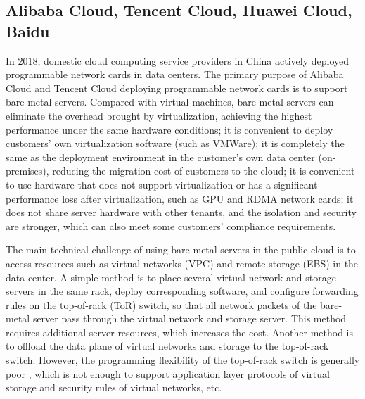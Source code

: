 \subsection{Alibaba Cloud, Tencent Cloud, Huawei Cloud, Baidu}

In 2018, domestic cloud computing service providers in China actively deployed programmable network cards in data centers. The primary purpose of Alibaba Cloud and Tencent Cloud deploying programmable network cards is to support bare-metal servers. Compared with virtual machines, bare-metal servers can eliminate the overhead brought by virtualization, achieving the highest performance under the same hardware conditions; it is convenient to deploy customers' own virtualization software (such as VMWare); it is completely the same as the deployment environment in the customer's own data center (on-premises), reducing the migration cost of customers to the cloud; it is convenient to use hardware that does not support virtualization or has a significant performance loss after virtualization, such as GPU and RDMA network cards; it does not share server hardware with other tenants, and the isolation and security are stronger, which can also meet some customers' compliance requirements.

The main technical challenge of using bare-metal servers in the public cloud is to access resources such as virtual networks (VPC) and remote storage (EBS) in the data center. A simple method is to place several virtual network and storage servers in the same rack, deploy corresponding software, and configure forwarding rules on the top-of-rack (ToR) switch, so that all network packets of the bare-metal server pass through the virtual network and storage server. This method requires additional server resources, which increases the cost. Another method is to offload the data plane of virtual networks and storage to the top-of-rack switch. However, the programming flexibility of the top-of-rack switch is generally poor \cite{tencent-smartnic}, which is not enough to support application layer protocols of virtual storage and security rules of virtual networks, etc.

